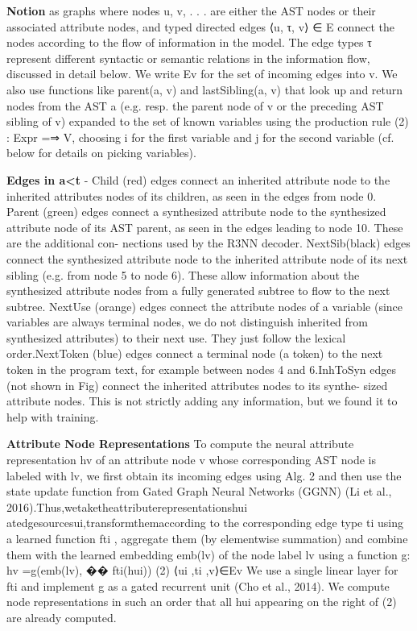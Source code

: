\documentclass{article}
\begin{document}
\textbf{Notion} as graphs where nodes u, v, . . . are either the AST nodes or their associated attribute nodes, and typed directed edges ⟨u, τ, v⟩ ∈ E connect the nodes according to the flow of information in the model. The edge types τ represent different syntactic or semantic relations in the information flow, discussed in detail below. We write Ev for the set of incoming edges into v. We also use functions like parent(a, v) and lastSibling(a, v) that look up and return nodes from the AST a (e.g. resp. the parent node of v or the preceding AST sibling of v) expanded to the set of known variables using the production rule (2) : Expr =⇒ V, choosing i for the first variable and j for the second variable (cf. below for details on picking variables).

\textbf{Edges in a<t} - Child (red) edges connect an inherited attribute node to the inherited attributes nodes of its children, as seen in the edges from node 0. Parent (green) edges connect a synthesized attribute node to the synthesized attribute node of its AST parent, as seen in the edges leading to node 10. These are the additional con- nections used by the R3NN decoder. NextSib(black) edges connect the synthesized attribute node to the inherited attribute node of its next sibling (e.g. from node 5 to node 6). These allow information about the synthesized attribute nodes from a fully generated subtree to flow to the next subtree. NextUse (orange) edges connect the attribute nodes of a variable (since variables are always terminal nodes, we do not distinguish inherited from synthesized attributes) to their next use. They just follow the lexical order.NextToken (blue) edges connect a terminal node (a token) to the next token in the program text, for example between nodes 4 and 6.InhToSyn edges (not shown in Fig) connect the inherited attributes nodes to its synthe- sized attribute nodes. This is not strictly adding any information, but we found it to help with training.

\textbf{Attribute Node Representations} To compute the neural attribute representation hv of an attribute node v whose corresponding AST node is labeled with lv, we first obtain its incoming edges using Alg. 2 and then use the state update function from Gated Graph Neural Networks (GGNN) (Li et al., 2016).Thus,wetaketheattributerepresentationshui atedgesourcesui,transformthemaccording to the corresponding edge type ti using a learned function fti , aggregate them (by elementwise summation) and combine them with the learned embedding emb(lv) of the node label lv using a function g:
hv =g(emb(lv), �� fti(hui)) (2) ⟨ui ,ti ,v⟩∈Ev
We use a single linear layer for fti and implement g as a gated recurrent unit (Cho et al., 2014). We compute node representations in such an order that all hui appearing on the right of (2) are already computed.
\end{document}
